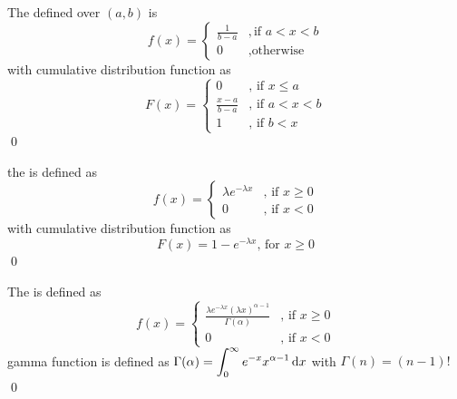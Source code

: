\begin{definition}
    The  defined over $(a,b)$ is 
    \begin{equation}
        f(x) = \begin{cases}
             {\displaystyle \frac{1}{b - a}} & , \text{if } a < x < b \\
            0 & , \text{otherwise}
        \end{cases}
    \end{equation}
    with cumulative distribution function as
    \begin{equation}
        F(x) = \begin{cases}
            0 & \text{, if } x \leq a \\
            \displaystyle \frac{x - a}{b - a} & \text{, if } a < x < b \\
            1 & \text{, if } b < x
        \end{cases}
    \end{equation}
    \qed
\end{definition}

\begin{definition}
    the  is defined as
    \begin{equation}
        f(x) = \begin{cases}
            \lambda e^{-\lambda x} & \text{, if } x \geq 0 \\
            0 & \text{, if } x < 0
        \end{cases}
    \end{equation}
    with cumulative distribution function as
    \begin{equation}
        F(x) = 1 - e^{-\lambda x} \text{, for } x \geq 0
    \end{equation}
    \qed
\end{definition}

\begin{definition}
    The  is defined as
    \begin{equation}
        f(x) = \begin{cases}
           \displaystyle \frac{\lambda e^{- \lambda x} (\lambda x)^{\alpha - 1}}{\Gamma(\alpha)} & \text{, if } x \geq 0 \\
            0 & \text{, if } x < 0
        \end{cases}
    \end{equation}
    gamma function is defined as $\Gamma(\alpha) =\displaystyle \int_{0}^\infty e^{-x} x^{\alpha - 1} \dif{x}$ with $\Gamma(n) = (n-1)!$
    \qed
\end{definition}



